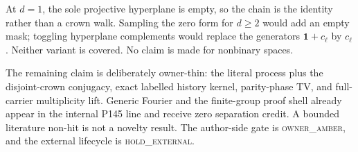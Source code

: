 \documentclass[a4paper,10pt]{amsart}
\theoremstyle{remark}
\newcommand{\one}{\mathbf 1}
\begin{document}
At $d=1$, the sole projective hyperplane is empty, so the chain is the
identity rather than a crown walk.  Sampling the zero form for $d\ge2$ would
add an empty mask; toggling hyperplane complements would replace the
generators $\one+c_\ell$ by $c_\ell$.  Neither variant is covered.  No claim
is made for nonbinary spaces.

The remaining claim is deliberately owner-thin: the literal process plus
the disjoint-crown conjugacy, exact labelled history kernel, parity-phase TV,
and full-carrier multiplicity lift.  Generic Fourier and the finite-group
proof shell already appear in the internal P145 line and receive zero
separation credit.  A bounded literature non-hit is not a novelty result.
The author-side gate is \textsc{owner\_amber}, and the external lifecycle is
\textsc{hold\_external}.



\end{document}
